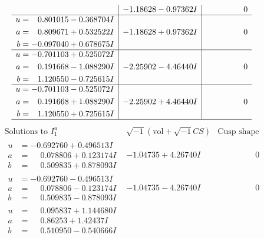 \documentclass[1p]{elsarticle_modified}
\theoremstyle{definition}
\newcommand{\I}{\sqrt{-1}}
\begin{document}
$$\begin{array}{c|c|c}
 & -1.18628 - 0.97362 I & \phantom{-0.000000 } 0 \\ \hline\begin{aligned}
u &= \phantom{-}0.801015 - 0.368704 I \\
a &= \phantom{-}0.809671 + 0.532522 I \\
b &= -0.097040 + 0.678675 I\end{aligned}
 & -1.18628 + 0.97362 I & \phantom{-0.000000 } 0 \\ \hline\begin{aligned}
u &= -0.701103 + 0.525072 I \\
a &= \phantom{-}0.191668 - 1.088290 I \\
b &= \phantom{-}1.120550 - 0.725615 I\end{aligned}
 & -2.25902 - 4.46440 I & \phantom{-0.000000 } 0 \\ \hline\begin{aligned}
u &= -0.701103 - 0.525072 I \\
a &= \phantom{-}0.191668 + 1.088290 I \\
b &= \phantom{-}1.120550 + 0.725615 I\end{aligned}
 & -2.25902 + 4.46440 I & \phantom{-0.000000 } 0\\
 \hline 
 \end{array}$$\newpage$$\begin{array}{c|c|c}  
\text{Solutions to }I^u_{1}& \I (\text{vol} + \sqrt{-1}CS) & \text{Cusp shape}\\
 \hline 
\begin{aligned}
u &= -0.692760 + 0.496513 I \\
a &= \phantom{-}0.078806 + 0.123174 I \\
b &= \phantom{-}0.509835 + 0.878093 I\end{aligned}
 & -1.04735 + 4.26740 I & \phantom{-0.000000 } 0 \\ \hline\begin{aligned}
u &= -0.692760 - 0.496513 I \\
a &= \phantom{-}0.078806 - 0.123174 I \\
b &= \phantom{-}0.509835 - 0.878093 I\end{aligned}
 & -1.04735 - 4.26740 I & \phantom{-0.000000 } 0 \\ \hline\begin{aligned}
u &= \phantom{-}0.095837 + 1.144680 I \\
a &= \phantom{-}0.86253 + 1.42437 I \\
b &= \phantom{-}0.510950 - 0.540666 I\end{aligned}

\end{array}$$
\end{document}

